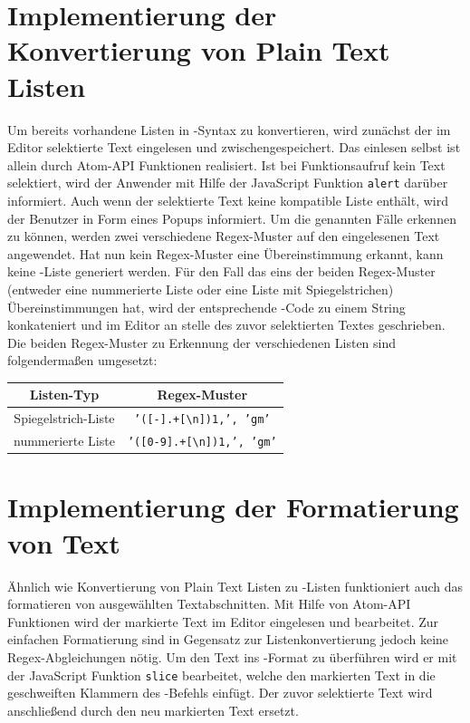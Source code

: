     \section{Implementierung der Konvertierung von Plain Text Listen}
        Um bereits vorhandene Listen in \latex-Syntax zu konvertieren, wird zunächst der im Editor selektierte Text eingelesen und zwischengespeichert. Das einlesen selbst ist allein durch Atom-API Funktionen realisiert. Ist bei Funktionsaufruf kein Text selektiert, wird der Anwender mit Hilfe der JavaScript Funktion \texttt{alert} darüber informiert. Auch wenn der selektierte Text keine kompatible Liste enthält, wird der Benutzer in Form eines Popups informiert. Um die genannten Fälle erkennen zu können, werden zwei verschiedene Regex-Muster auf den eingelesenen Text angewendet. Hat nun kein Regex-Muster eine Übereinstimmung erkannt, kann keine \latex-Liste generiert werden. Für den Fall das eins der beiden Regex-Muster (entweder eine nummerierte Liste oder eine Liste mit Spiegelstrichen) Übereinstimmungen hat, wird der entsprechende \latex-Code zu einem String konkateniert und im Editor an stelle des zuvor selektierten Textes geschrieben.
        \\
        Die beiden Regex-Muster zu Erkennung der verschiedenen Listen sind folgendermaßen umgesetzt:
        \\[5mm]
        \begin{minipage}{\textwidth}
            \centering
            \begin{tabular}{ | c | c | }
              \hline
              \textbf{Listen-Typ} & \textbf{Regex-Muster} \\
              \hline
              Spiegelstrich-Liste & \texttt{'([-].+[\textbackslash n]){1,}', 'gm'} \\
              nummerierte Liste & \texttt{'([0-9].+[\textbackslash n]){1,}', 'gm'} \\
              \hline
            \end{tabular}
        \end{minipage}

    \section{Implementierung der Formatierung von Text}
        Ähnlich wie Konvertierung von Plain Text Listen zu \latex-Listen funktioniert auch das formatieren von ausgewählten Textabschnitten. Mit Hilfe von Atom-API Funktionen wird der markierte Text im Editor eingelesen und bearbeitet. Zur einfachen Formatierung sind in Gegensatz zur Listenkonvertierung jedoch keine Regex-Abgleichungen nötig. Um den Text ins \latex-Format zu überführen wird er mit der JavaScript Funktion \texttt{slice} bearbeitet, welche den markierten Text in die geschweiften Klammern des \latex-Befehls einfügt. Der zuvor selektierte Text wird anschließend durch den neu markierten Text ersetzt.

